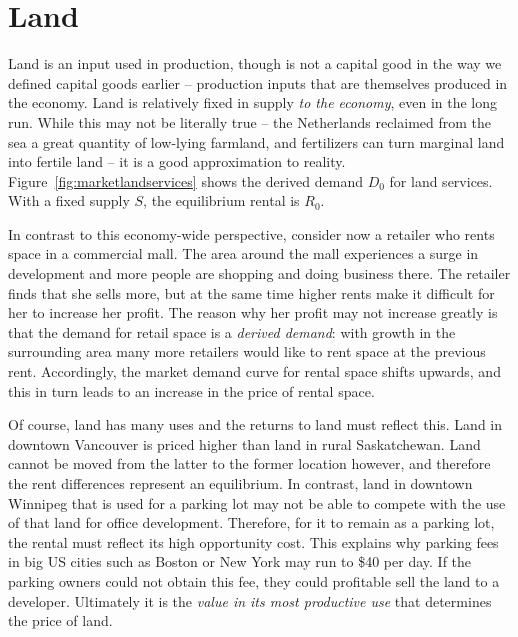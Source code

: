 \section{Land}\label{sec:ch12sec7}

Land is an input used in production, though is not a capital good in the way we defined capital goods earlier -- production inputs that are themselves produced in the economy. Land is relatively fixed in supply \textit{to the economy}, even in the long run. While this may not be literally true -- the Netherlands reclaimed from the sea a great quantity of low-lying farmland, and fertilizers can turn marginal land into fertile land -- it is a good approximation to reality. Figure~\ref{fig:marketlandservices} shows the derived demand $D_0$ for land services. With a fixed supply $S$, the equilibrium rental is $R_0$.

 

In contrast to this economy-wide perspective, consider now a retailer who rents space in a commercial mall. The area around the mall experiences a surge in development and more people are shopping and doing business there. The retailer finds that she sells more, but at the same time higher rents make it difficult for her to increase her profit. The reason why her profit may not increase greatly is that the demand for retail space is a \textit{derived demand}: with growth in the surrounding area many more retailers would like to rent space at the previous rent. Accordingly, the market demand curve for rental space shifts upwards, and this in turn leads to an increase in the price of rental space.

Of course, land has many uses and the returns to land must reflect this. Land in downtown Vancouver is priced higher than land in rural Saskatchewan. Land cannot be moved from the latter to the former location however, and therefore the rent differences represent an equilibrium. In contrast, land in downtown Winnipeg that is used for a parking lot may not be able to compete with the use of that land for office development. Therefore, for it to remain as a parking lot, the rental must reflect its high opportunity cost. This explains why parking fees in big US cities such as Boston or New York may run to \$40 per day.  If the parking owners could not obtain this fee, they could profitable sell the land to a developer. Ultimately it is the \textit{value in its most productive use} that determines the price of land.
